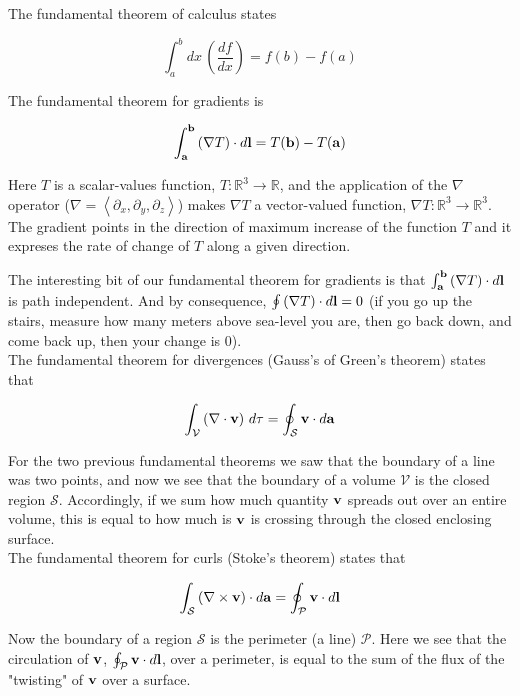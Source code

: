 The fundamental theorem of calculus states

$$
\int_{a}^{b} dx \, \left(\frac{df}{dx}\right) = f(b) - f(a)
$$

The fundamental theorem for gradients is

$$
\int_{\boldsymbol{\mathbf{a}}}^{\boldsymbol{\mathbf{b}}} \left(\nabla T\right) \cdot d\boldsymbol{\mathbf{l}}
= T(\boldsymbol{\mathbf{b}}) - T(\boldsymbol{\mathbf{a}})
$$

Here $T$ is a scalar-values function, $T : \mathbb{R}^3 \rightarrow \mathbb{R}$, and the application of the
$\nabla$ operator ($\nabla = \left< \partial_x, \partial_y, \partial_z \right>$) makes $\nabla T$ a vector-valued function,
$\nabla T : \mathbb{R}^3 \rightarrow \mathbb{R}^3$.
The gradient points in the direction of maximum increase of the function $T$ and it expreses the rate of change of $T$
along a given direction.

The interesting bit of our fundamental theorem for gradients is that $\int_{\boldsymbol{\mathbf{a}}}^{\boldsymbol{\mathbf{b}}} \left(\nabla T\right) \cdot d\boldsymbol{\mathbf{l}}$
is path independent.
And by consequence, $\oint \left(\nabla T\right) \cdot d\boldsymbol{\mathbf{l}} = 0$
(if you go up the stairs, measure how many meters above sea-level you are, then go back down, and come back up, then your
change is 0).
\\

The fundamental theorem for divergences (Gauss's of Green's theorem) states that

$$
\int_{\mathcal{V}} \left(\nabla\cdot \boldsymbol{\mathbf{v}}\right) \, d\tau
= \oint_{\mathcal{S}} \boldsymbol{\mathbf{v}}\cdot d\boldsymbol{\mathbf{a}}
$$

For the two previous fundamental theorems we saw that the boundary of a line was two points, and now we see that the boundary
of a volume $\mathcal{V}$ is the closed region $\mathcal{S}$.
Accordingly, if we sum how much quantity $\boldsymbol{\mathbf{v}}$ spreads out over an entire volume, this is equal to how much
is $\boldsymbol{\mathbf{v}}$ is crossing through the closed enclosing surface.
\\

The fundamental theorem for curls (Stoke's theorem) states that

$$
\int_{\mathcal{S}} \left( \nabla\times\boldsymbol{\mathbf{v}} \right) \cdot d\boldsymbol{\mathbf{a}}
= \oint_{\mathcal{P}} \boldsymbol{\mathbf{v}} \cdot d\boldsymbol{\mathbf{l}}
$$

Now the boundary of a region $\mathcal{S}$ is the perimeter (a line) $\mathcal{P}$.
Here we see that the circulation of $\boldsymbol{\mathbf{v}}$, $\oint_{\mathcal{P}} \boldsymbol{\mathbf{v}} \cdot d\boldsymbol{\mathbf{l}}$, over a perimeter,
is equal to the sum of the flux of the "twisting" of $\boldsymbol{\mathbf{v}}$ over a surface.


